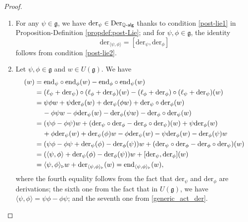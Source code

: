 \documentclass[11pt, a4paper]{amsart}
\numberwithin{equation}{section}
\theoremstyle{definition}
\newcommand{\Q}{\mathbb{Q}}
\begin{document}
\begin{proof}
\begin{enumerate}[label=(\alph*), leftmargin=*]
\item For any $\psi \in \mathfrak{g}$, we have $\mathrm{der}_\psi \in \mathrm{Der}_{\Q{\text-}\mathsf{alg}}$ thanks to condition \ref{post-lie1} in Proposition-Definition \ref{propdef:post-Lie}; and for $\psi, \phi \in \mathfrak{g}$, the identity
\[
\mathrm{der}_{\langle \psi, \phi\rangle} = [\mathrm{der}_\psi, \mathrm{der}_\phi]
\]
follows from condition \ref{post-lie2}. 
\item Let $\psi, \phi \in \mathfrak{g}$ and $w \in U(\mathfrak{g})$. We have
\begin{align*}
[\mathrm{end}_\psi, \mathrm{end}_\phi](w) & = \mathrm{end}_\psi \circ \mathrm{end}_\phi(w) - \mathrm{end}_\phi \circ \mathrm{end}_\psi(w) \\
& = (\ell_\psi + \mathrm{der}_\psi) \circ (\ell_\phi + \mathrm{der}_\phi)(w) - (\ell_\phi + \mathrm{der}_\phi) \circ (\ell_\psi + \mathrm{der}_\psi)(w) \\
& = \psi \phi w + \psi \mathrm{der}_\phi(w) + \mathrm{der}_\psi(\phi w) + \mathrm{der}_\psi \circ \mathrm{der}_\phi(w) \\
& \hspace{0.4cm} - \phi \psi w - \phi \mathrm{der}_\psi(w) - \mathrm{der}_\phi(\psi w) - \mathrm{der}_\phi \circ \mathrm{der}_\psi(w) \\
& = (\psi \phi - \phi \psi) w + (\mathrm{der}_\psi \circ \mathrm{der}_\phi - \mathrm{der}_\phi \circ \mathrm{der}_\psi)(w) + \psi \mathrm{der}_\phi(w) \\
& \hspace{0.4cm} + \phi \mathrm{der}_\psi(w) + \mathrm{der}_\psi(\phi) w - \phi \mathrm{der}_\psi(w) - \psi \mathrm{der}_\phi(w) - \mathrm{der}_\phi(\psi) w \\
& = (\psi \phi - \phi \psi + \mathrm{der}_\psi(\phi) - \mathrm{der}_\phi(\psi)) w + (\mathrm{der}_\psi \circ \mathrm{der}_\phi - \mathrm{der}_\phi \circ \mathrm{der}_\psi)(w) \\
& = (\langle \psi, \phi\rangle + \mathrm{der}_\psi(\phi) - \mathrm{der}_\phi(\psi)) w + [\mathrm{der}_\psi, \mathrm{der}_\phi](w) \\
& = \langle \psi, \phi\rangle_\triangleright w + \mathrm{der}_{\langle\psi, \phi\rangle_\triangleright}(w) = \mathrm{end}_{\langle\psi, \phi\rangle_\triangleright}(w),
\end{align*}
where the fourth equality follows from the fact that $\mathrm{der}_\psi$ and $\mathrm{der}_\phi$ are derivations; the sixth one from the fact that in $U(\mathfrak{g})$, we have $\langle \psi, \phi\rangle = \psi \phi - \phi \psi$; and the seventh one from \ref{generic_act_der}. \qedhere 
\end{enumerate}
\end{proof}



\end{document}
